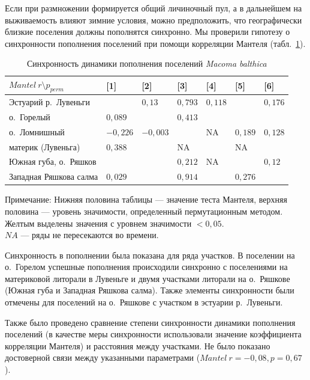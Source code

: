Если при размножении формируется общий личиночный пул, а в дальнейшем на выживаемость влияют зимние условия, можно предположить, что географически близкие поселения должны пополнятся синхронно.
Мы проверили гипотезу о синхронности пополнения поселений при помощи корреляции Мантеля (табл.~\ref{tab:Mantel_dynamic_N1y}).
	\begin{table}[p]
	\caption{Синхронность динамики пополнения поселений {\it Macoma balthica}}
	\label{tab:Mantel_dynamic_N1y}
        \begin{tabularx}{\textwidth}{|p{}|*{6}{X|}} 
	\hline
	$Mantel \ r \setminus p_{perm}$ & [1] & [2] & [3] & [4] & [5] & [6] \\ \hline
	[1] Эстуарий р.~Лувеньги             &         & $0,13$    & $0,793$      & $0,118$   & \cellcolor{yellow}{$0,001$} & $0,176$ \\ \hline
	[2] о.~Горелый             & $0,089$   &         & $0,413$      & \cellcolor{yellow}{$0,009$}   & \cellcolor{yellow}{$0,004$} & \cellcolor{yellow}{$0,001$} \\ \hline
	[3] о.~Ломнишный          & $-0,226$  & $-0,003$  &            & NA      & $0,189$ & $0,128$ \\ \hline
	[4] материк (Лувеньга)             & $0,388$   & \cellcolor{yellow}{$0,955$}   & NA         &         & NA    & \cellcolor{yellow}{$0,02$}  \\ \hline
	[5] Южная губа, о.~Ряшков                 & \cellcolor{yellow}{$0,793$}   & \cellcolor{yellow}{$0,515$}   & $0,212$      & NA      &       & $0,12$  \\ \hline
	[6] Западная Ряшкова салма                 & $0,029$   & \cellcolor{yellow}{$0,986$}   & $0,914$      & \cellcolor{yellow}{$0,965$}   & $0,276$ &       \\ \hline 
	\end{tabularx}
	   {\footnotesize Примечание: Нижняя половина таблицы --- значение теста Мантеля, верхняя половина --- уровень значимости, определенный пермутационным методом. \\
	Желтым выделены значения с уровнем значимости $< 0,05$. \\
	$NA$ --- ряды не пересекаются во времени.}
	\end{table}
Синхронность в пополнении была показана для ряда участков.
В поселении на о.~Горелом успешные пополнения происходили синхронно с поселениями на материковой литорали в Лувеньге и двумя участками литорали на о.~Ряшкове (Южная губа и Западная Ряшкова салма).
Также элементы синхронности были отмечены для поселений на о.~Ряшкове с участком в эстуарии р.~Лувеньги.

Также было проведено сравнение степени синхронности динамики пополнения поселений (в качестве меры синхронности использовали значение коэффициента корреляции Мантеля) и расстояния между участками.
Не было показано достоверной связи между указанными параметрами ($Mantel\ r = -0,08, p = 0,67$ ).

